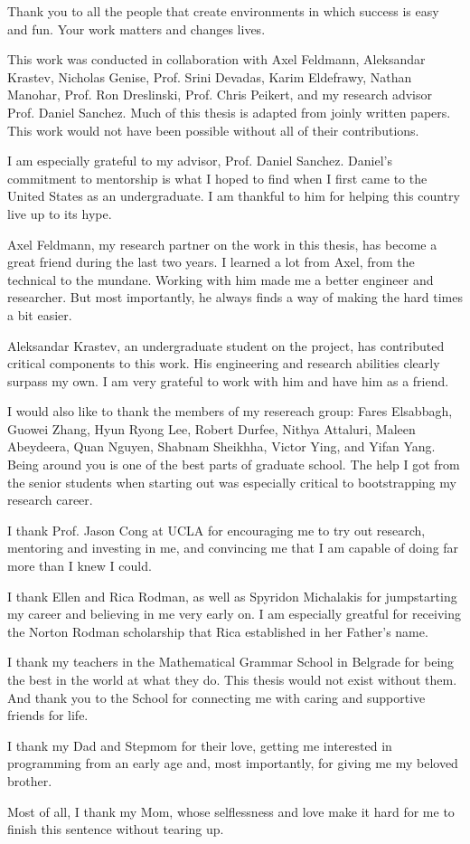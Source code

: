Thank you to all the people that create environments in which success is easy
and fun. Your work matters and changes lives.

This work was conducted in collaboration with Axel Feldmann, Aleksandar
Krastev, Nicholas Genise, Prof. Srini Devadas, Karim Eldefrawy, Nathan Manohar,
Prof. Ron Dreslinski, Prof. Chris Peikert, and my research advisor Prof. Daniel
Sanchez. Much of this thesis is adapted from joinly written papers. This work
would not have been possible without all of their contributions.

I am especially grateful to my advisor, Prof. Daniel Sanchez. Daniel's
commitment to mentorship is what I hoped to find when I first came to the
United States as an undergraduate. I am thankful to him for helping this
country live up to its hype.

Axel Feldmann, my research partner on the work in this thesis, has become a
great friend during the last two years. I learned a lot from Axel, from the
technical to the mundane. Working with him made me a better engineer and
researcher. But most importantly, he always finds a way of making the hard
times a bit easier.

Aleksandar Krastev, an undergraduate student on the project, has contributed
critical components to this work. His engineering and research abilities
clearly surpass my own. I am very grateful to work with him and have him as a
friend.

I would also like to thank the members of my resereach group: Fares Elsabbagh,
Guowei Zhang, Hyun Ryong Lee, Robert Durfee, Nithya Attaluri, Maleen Abeydeera,
Quan Nguyen, Shabnam Sheikhha, Victor Ying, and Yifan Yang. Being around you is
one of the best parts of graduate school. The help I got from the senior
students when starting out was especially critical to bootstrapping my
research career.

I thank Prof. Jason Cong at UCLA for encouraging me to try out research,
mentoring and investing in me, and convincing me that I am capable of doing far
more than I knew I could.

I thank Ellen and Rica Rodman, as well as Spyridon Michalakis for jumpstarting
my career and believing in me very early on. I am especially greatful for
receiving the Norton Rodman scholarship that Rica established in her Father's
name.

I thank my teachers in the Mathematical Grammar School in Belgrade for being
the best in the world at what they do. This thesis would not exist without
them. And thank you to the School for connecting me with caring and supportive
friends for life.

I thank my Dad and Stepmom for their love, getting me interested in programming
from an early age and, most importantly, for giving me my beloved brother.

Most of all, I thank my Mom, whose selflessness and love make it hard for me to
finish this sentence without tearing up.
